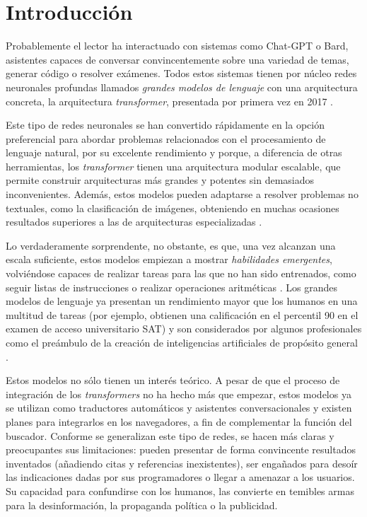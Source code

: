 \cleardoublepage

\chapter{Introducción}
Probablemente el lector ha interactuado con sistemas como Chat-GPT o Bard, asistentes capaces de conversar convincentemente sobre una variedad de temas, generar código o resolver exámenes. Todos estos sistemas tienen por núcleo redes neuronales profundas llamados \textit{grandes modelos de lenguaje} con una arquitectura concreta, la arquitectura \textit{transformer}, presentada por primera vez en 2017 \cite{vaswani2017attention}.

Este tipo de redes neuronales se han convertido rápidamente en la opción preferencial para abordar problemas relacionados con el procesamiento de lenguaje natural, por su excelente rendimiento y porque, a diferencia de otras herramientas, los \textit{transformer} tienen una arquitectura modular escalable, que permite construir arquitecturas más grandes y potentes sin demasiados inconvenientes. Además, estos modelos pueden adaptarse a resolver problemas no textuales, como la clasificación de imágenes, obteniendo en muchas ocasiones resultados superiores a las de arquitecturas especializadas \cite{dosovitskiy2020image}.

Lo verdaderamente sorprendente, no obstante, es que, una vez alcanzan una escala suficiente, estos modelos empiezan a mostrar \textit{habilidades emergentes}, volviéndose capaces de realizar tareas para las que no han sido entrenados, como seguir listas de instrucciones o realizar operaciones aritméticas \cite{wei2022emergent}. Los grandes modelos de lenguaje ya presentan un rendimiento mayor que los humanos en una multitud de tareas (por ejemplo, obtienen una calificación en el percentil 90 en el examen de acceso universitario SAT) y son considerados por algunos profesionales como el preámbulo de la creación de inteligencias artificiales de propósito general \cite{bubeck2023sparks}.

Estos modelos no sólo tienen un interés teórico. A pesar de que el proceso de integración de los \textit{transformers} no ha hecho más que empezar, estos modelos ya se utilizan como traductores automáticos y asistentes conversacionales y existen planes para integrarlos en los navegadores, a fin de complementar la función del buscador. Conforme se generalizan este tipo de redes, se hacen más claras y preocupantes sus limitaciones: pueden presentar de forma convincente resultados inventados (añadiendo citas y referencias inexistentes), ser engañados para desoír las indicaciones dadas por sus programadores o llegar a amenazar a los usuarios. Su capacidad para confundirse con los humanos, las convierte en temibles armas para la desinformación, la propaganda política o la publicidad. 

